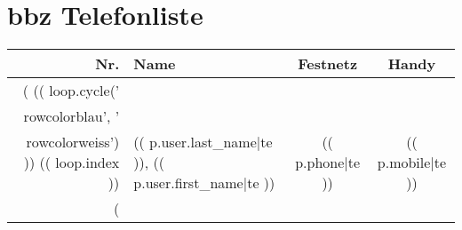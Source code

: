 \documentclass[a4paper]{scrartcl}
\begin{document}
\sffamily

\section*{bbz Telefonliste}

\begin{longtable}{r|l|c|c}
Nr. & Name & Festnetz & Handy\\
\endhead
\hline
(%
(( loop.cycle('\\rowcolor{blau}', '\\rowcolor{weiss}') ))
(( loop.index )) & (( p.user.last_name|te )), (( p.user.first_name|te )) & (( p.phone|te )) & (( p.mobile|te ))\\
\hline
(%
\end{longtable}
\end{document}
